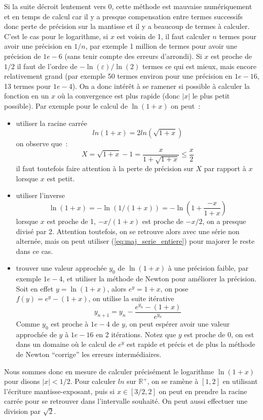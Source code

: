 \documentclass[a4paper,11pt]{article}
\newcommand{\R}{{\mathbb{R}}}
\begin{document}
\begin{giacjshere}
Si la suite d\'ecroit lentement vers 0, cette m\'ethode est
mauvaise num\'eriquement et en temps de calcul
car il y a presque compensation entre
termes successifs donc perte de pr\'ecision sur la mantisse et il
y a beaucoup de termes \`a calculer. C'est le cas pour le logarithme,
si $x$ est voisin de 1, il faut calculer $n$ termes pour avoir une
pr\'ecision en $1/n$, par exemple 1 million de termes pour avoir
une pr\'ecision de $1e-6$ (sans tenir compte des erreurs d'arrondi). 
Si $x$ est proche de $1/2$ il faut de l'ordre
de $-\ln(\varepsilon)/\ln(2)$ termes ce qui est mieux, mais encore
relativement grand (par exemple
50 termes environ pour une pr\'ecision en $1e-16$,
13 termes pour $1e-4$).
On a donc int\'er\^et \`a se
ramener si possible \`a calculer la fonction en un $x$ o\`u la
convergence est plus rapide (donc $|x|$ le plus petit possible).
Par exemple pour le calcul de $\ln(1+x)$ on peut~:
\begin{itemize}
\item utiliser la racine carr\'ee
\[ ln(1+x)= 2 ln(\sqrt{1+x})\]
on observe que~:
\[ X=\sqrt{1+x}-1 = \frac{x}{1+\sqrt{1+x}} \leq \frac{x}{2} \]
il faut toutefois faire attention \`a la perte de pr\'ecision sur
$X$ par rapport \`a $x$ lorsque $x$ est petit.
\item utiliser l'inverse
\[ \ln(1+x)=-\ln(1/(1+x))=-\ln(1 + \frac{-x}{1+x}) \]
lorsque $x$ est proche de 1, $-x/(1+x)$ est proche de $-x/2$, on
a presque divis\'e par 2. Attention toutefois, on se retrouve alors
avec une s\'erie non altern\'ee, mais on peut utiliser 
(\ref{eq:maj_serie_entiere}) pour majorer le reste dans ce cas.
\item trouver une valeur approch\'ee $y_0$ de $\ln(1+x)$ \`a une pr\'ecision
faible, par exemple $1e-4$, et utiliser la m\'ethode de Newton pour
am\'eliorer la pr\'ecision. Soit en effet $y=\ln(1+x)$, alors
$e^y=1+x$, on pose $f(y)=e^y-(1+x)$, on utilise la suite it\'erative
\[ y_{n+1} = y_n - \frac{e^{y_n}-(1+x)}{e^{y_n}}  \]
Comme $y_0$ est proche \`a $1e-4$ de $y$, on peut esp\'erer avoir
une valeur approch\'ee de $y$ \`a $1e-16$ en 2 it\'erations. Notez
que $y$ est proche de $0$, on est dans un domaine o\`u le calcul
de $e^y$ est rapide et pr\'ecis et de plus la m\'ethode de Newton
``corrige'' les erreurs interm\'ediaires.
\end{itemize}

Nous sommes donc en mesure de calculer pr\'ecis\'ement le logarithme
$\ln(1+x)$ pour disons $|x|<1/2$. Pour calculer $ln$ sur $\R^+$,
on se ram\`ene \`a $[1,2]$ en utilisant l'\'ecriture
mantisse-exposant, puis si $x\in[3/2,2]$ on peut en prendre la racine
carr\'ee pour se retrouver dans l'intervalle souhait\'e.
On peut aussi effectuer une division par $\sqrt{2}$.


\end{giacjshere}
\end{document}
